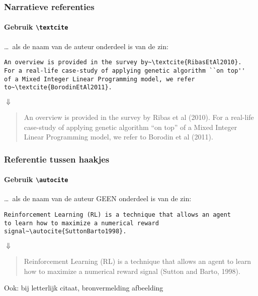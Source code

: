 \documentclass[aspectratio=169]{beamer}
\begin{document}
\begin{frame}
  \frametitle{Narratieve referenties}
  \framesubtitle{Gebruik \texttt{\textbackslash{}textcite}}

  \ldots\ als de naam van de auteur onderdeel is van de zin:

  \bigskip

  \small
  \begin{verbatim}
An overview is provided in the survey by~\textcite{RibasEtAl2010}.
For a real-life case-study of applying genetic algorithm ``on top''
of a Mixed Integer Linear Programming model, we refer
to~\textcite{BorodinEtAl2011}.
\end{verbatim}
  \normalsize

  \begin{center}
    $\Downarrow$
  \end{center}

  \begin{quotation}
    An overview is provided in the survey by Ribas et al (2010). For a real-life case-study of applying genetic algorithm ``on top'' of a Mixed Integer Linear Programming model, we refer to Borodin et al (2011).
  \end{quotation}
\end{frame}

\begin{frame}[fragile]
  \frametitle{Referentie tussen haakjes}
  \framesubtitle{Gebruik \texttt{\textbackslash{}autocite}}

  \ldots\ als de naam van de auteur GEEN onderdeel is van de zin:

  \medskip

  \small
  \begin{verbatim}
Reinforcement Learning (RL) is a technique that allows an agent
to learn how to maximize a numerical reward
signal~\autocite{SuttonBarto1998}.
\end{verbatim}
  \normalsize

  \begin{center}
    $\Downarrow$
  \end{center}

  \begin{quotation}
    Reinforcement Learning (RL) is a technique that allows an agent to learn how to maximize a numerical reward signal (Sutton and Barto, 1998).
  \end{quotation}

  \bigskip

  Ook: bij letterlijk citaat, bronvermelding afbeelding

\end{frame}
\end{document}
